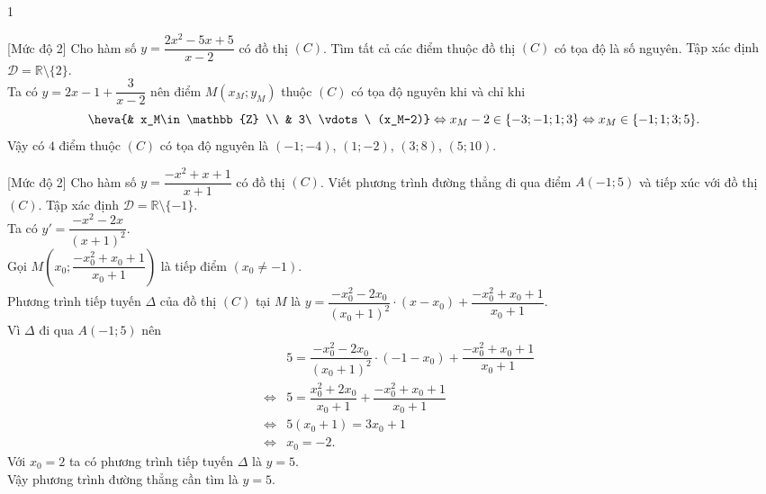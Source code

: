 \begin{bt}
{\begin{enumEX}{1}
{}
\end{enumEX}
	}	
\end{bt}

\begin{bt}%
[Mức độ 2]%
Cho hàm số $y=\dfrac{2x^2-5x+5}{x-2}$ có đồ thị $(C)$. Tìm tất cả các điểm thuộc đồ thị $(C)$ có tọa độ là số nguyên.
\loigiai
{Tập xác định $\mathscr{D}=\mathbb{R}\setminus\{2\}$.\\
Ta có $y=2x-1+\dfrac{3}{x-2}$ nên điểm $M(x_M;y_M)$ thuộc $(C)$ có tọa độ nguyên khi và chỉ khi \[\heva{& x_M\in\mathbb{Z} \\ & 3\ \vdots\ (x_M-2)}\Leftrightarrow x_M-2\in\{-3;-1;1;3\}\Leftrightarrow x_M\in\{-1;1;3;5\}.
\]
Vậy có $4$ điểm thuộc $(C)$ có tọa độ nguyên là $(-1;-4)$, $(1;-2)$, $(3;8)$, $(5;10)$.
}
\end{bt}

\begin{bt}%
[Mức độ 2]%
Cho hàm số $y=\dfrac{-x^2+x+1}{x+1}$ có đồ thị $(C)$. Viết phương trình đường thẳng đi qua điểm $A(-1;5)$ và tiếp xúc với đồ thị $(C)$.
\loigiai
{Tập xác định $\mathscr{D}=\mathbb{R}\setminus\{-1\}$.\\
Ta có $y'=\dfrac{-x^2-2x}{(x+1)^2}$.\\
Gọi $M\left(x_0;\dfrac{-x_0^2+x_0+1}{x_0+1}\right)$  là tiếp điểm $(x_0\neq -1)$.\\
Phương trình tiếp tuyến $\Delta$  của đồ thị $(C)$ tại $M$ là $y=\dfrac{-x_0^2-2x_0}{(x_0+1)^2}\cdot (x-x_0)+\dfrac{-x_0^2+x_0+1}{x_0+1}$.\\
Vì $\Delta$ đi qua $A(-1;5)$ nên \begin{eqnarray*}
&& 5=\dfrac{-x_0^2-2x_0}{(x_0+1)^2}\cdot (-1-x_0)+\dfrac{-x_0^2+x_0+1}{x_0+1}\\
&\Leftrightarrow & 5=\dfrac{x_0^2+2x_0}{x_0+1}+\dfrac{-x_0^2+x_0+1}{x_0+1}\\
&\Leftrightarrow & 5(x_0+1)=3x_0+1\\
&\Leftrightarrow & x_0=-2.
\end{eqnarray*}
Với $x_0=2$ ta có phương trình tiếp tuyến $\Delta$ là $y=5$.\\
Vậy phương trình đường thẳng cần tìm là $y=5$.
}
\end{bt}

